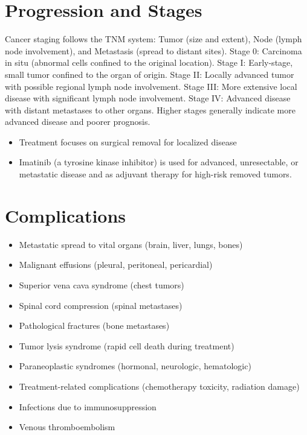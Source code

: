 \section{Progression and Stages}
Cancer staging follows the TNM system: Tumor (size and extent), Node (lymph node involvement), and Metastasis (spread to distant sites). Stage 0: Carcinoma in situ (abnormal cells confined to the original location). Stage I: Early-stage, small tumor confined to the organ of origin. Stage II: Locally advanced tumor with possible regional lymph node involvement. Stage III: More extensive local disease with significant lymph node involvement. Stage IV: Advanced disease with distant metastases to other organs. Higher stages generally indicate more advanced disease and poorer prognosis.

\begin{itemize}[noitemsep]
  \item Treatment focuses on surgical removal for localized disease
  \item Imatinib (a tyrosine kinase inhibitor) is used for advanced, unresectable, or metastatic disease and as adjuvant therapy for high-risk removed tumors.
\end{itemize}
\section{Complications}
\begin{itemize}[noitemsep]
  \item Metastatic spread to vital organs (brain, liver, lungs, bones)
  \item Malignant effusions (pleural, peritoneal, pericardial)
  \item Superior vena cava syndrome (chest tumors)
  \item Spinal cord compression (spinal metastases)
  \item Pathological fractures (bone metastases)
  \item Tumor lysis syndrome (rapid cell death during treatment)
  \item Paraneoplastic syndromes (hormonal, neurologic, hematologic)
  \item Treatment-related complications (chemotherapy toxicity, radiation damage)
  \item Infections due to immunosuppression
  \item Venous thromboembolism
\end{itemize}
